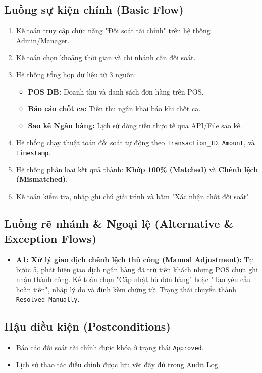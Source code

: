 \documentclass[11pt,a4paper]{article}
\begin{document}
	\subsection*{Luồng sự kiện chính (Basic Flow)}
	\begin{enumerate}
		\item Kế toán truy cập chức năng "Đối soát tài chính" trên hệ thống Admin/Manager.
		\item Kế toán chọn khoảng thời gian và chi nhánh cần đối soát.
		\item Hệ thống tổng hợp dữ liệu từ 3 nguồn:
		\begin{itemize}
			\item \textbf{POS DB:} Doanh thu và danh sách đơn hàng trên POS.
			\item \textbf{Báo cáo chốt ca:} Tiền thu ngân khai báo khi chốt ca.
			\item \textbf{Sao kê Ngân hàng:} Lịch sử dòng tiền thực tế qua API/File sao kê.
		\end{itemize}
		\item Hệ thống chạy thuật toán đối soát tự động theo \texttt{Transaction\_ID}, \texttt{Amount}, và \texttt{Timestamp}.
		\item Hệ thống phân loại kết quả thành: \textbf{Khớp 100\% (Matched)} và \textbf{Chênh lệch (Mismatched)}.
		\item Kế toán kiểm tra, nhập ghi chú giải trình và bấm "Xác nhận chốt đối soát".
	\end{enumerate}
	
	\subsection*{Luồng rẽ nhánh \& Ngoại lệ (Alternative \& Exception Flows)}
	\begin{itemize}
		\item \textbf{A1: Xử lý giao dịch chênh lệch thủ công (Manual Adjustment):} Tại bước 5, phát hiện giao dịch ngân hàng đã trừ tiền khách nhưng POS chưa ghi nhận thành công. Kế toán chọn "Cập nhật bù đơn hàng" hoặc "Tạo yêu cầu hoàn tiền", nhập lý do và đính kèm chứng từ. Trạng thái chuyển thành \texttt{Resolved\_Manually}.
	\end{itemize}
	
	\subsection*{Hậu điều kiện (Postconditions)}
	\begin{itemize}
		\item Báo cáo đối soát tài chính được khóa ở trạng thái \texttt{Approved}.
		\item Lịch sử thao tác điều chỉnh được lưu vết đầy đủ trong Audit Log.
	\end{itemize}
	
\end{document}

